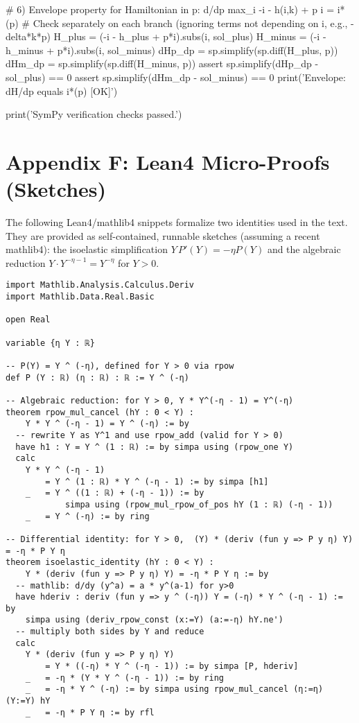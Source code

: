 \documentclass[11pt,letterpaper,oneside]{article}
\numberwithin{equation}{section}
\newcommand{\1}{\mathbf{1}}
\begin{document}
\begin{pyconsole}
# 6) Envelope property for Hamiltonian in p: d/dp max_i { -i - h(i,k) + p i } = i*(p)
#    Check separately on each branch (ignoring terms not depending on i, e.g., -delta*k*p)
H_plus  = (-i - h_plus + p*i).subs(i, sol_plus)
H_minus = (-i - h_minus + p*i).subs(i, sol_minus)
dHp_dp  = sp.simplify(sp.diff(H_plus, p))
dHm_dp  = sp.simplify(sp.diff(H_minus, p))
assert sp.simplify(dHp_dp - sol_plus) == 0
assert sp.simplify(dHm_dp - sol_minus) == 0
print('Envelope: dH/dp equals i*(p)       [OK]')

print('\nAll SymPy verification checks passed.')
\end{pyconsole}

\section{Appendix F: Lean4 Micro-Proofs (Sketches)}\label{app:lean}

\noindent The following Lean4/mathlib4 snippets formalize two identities used in the text. They are provided as self-contained, runnable sketches (assuming a recent mathlib4): the isoelastic simplification $Y\,P'(Y)=-\eta P(Y)$ and the algebraic reduction $Y\cdot Y^{-\eta-1}=Y^{-\eta}$ for $Y>0$.

\lstset{basicstyle=\ttfamily\small,columns=fullflexible,showstringspaces=false,frame=single,framerule=0.4pt,breaklines=true,tabsize=2,captionpos=b}
\begin{lstlisting}[language=Lean,caption={Lean4: isoelastic identity and algebraic reduction}]
import Mathlib.Analysis.Calculus.Deriv
import Mathlib.Data.Real.Basic

open Real

variable {η Y : ℝ}

-- P(Y) = Y ^ (-η), defined for Y > 0 via rpow
def P (Y : ℝ) (η : ℝ) : ℝ := Y ^ (-η)

-- Algebraic reduction: for Y > 0, Y * Y^(-η - 1) = Y^(-η)
theorem rpow_mul_cancel (hY : 0 < Y) :
    Y * Y ^ (-η - 1) = Y ^ (-η) := by
  -- rewrite Y as Y^1 and use rpow_add (valid for Y > 0)
  have h1 : Y = Y ^ (1 : ℝ) := by simpa using (rpow_one Y)
  calc
    Y * Y ^ (-η - 1)
        = Y ^ (1 : ℝ) * Y ^ (-η - 1) := by simpa [h1]
    _   = Y ^ ((1 : ℝ) + (-η - 1)) := by
            simpa using (rpow_mul_rpow_of_pos hY (1 : ℝ) (-η - 1))
    _   = Y ^ (-η) := by ring

-- Differential identity: for Y > 0,  (Y) * (deriv (fun y => P y η) Y) = -η * P Y η
theorem isoelastic_identity (hY : 0 < Y) :
    Y * (deriv (fun y => P y η) Y) = -η * P Y η := by
  -- mathlib: d/dy (y^a) = a * y^(a-1) for y>0
  have hderiv : deriv (fun y => y ^ (-η)) Y = (-η) * Y ^ (-η - 1) := by
    simpa using (deriv_rpow_const (x:=Y) (a:=-η) hY.ne')
  -- multiply both sides by Y and reduce
  calc
    Y * (deriv (fun y => P y η) Y)
        = Y * ((-η) * Y ^ (-η - 1)) := by simpa [P, hderiv]
    _   = -η * (Y * Y ^ (-η - 1)) := by ring
    _   = -η * Y ^ (-η) := by simpa using rpow_mul_cancel (η:=η) (Y:=Y) hY
    _   = -η * P Y η := by rfl
\end{lstlisting}
\end{document}
